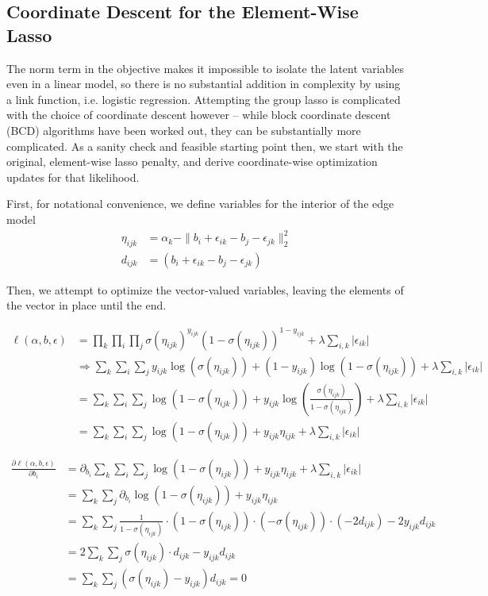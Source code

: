 \documentclass[11pt]{scrartcl}
\begin{document}
\subsection{Coordinate Descent for the Element-Wise Lasso}

The norm term in the objective makes it impossible to isolate the latent variables even in a linear model, so there is no substantial addition in complexity by using a link function, i.e. logistic regression. Attempting the group lasso is complicated with the choice of coordinate descent however -- while block coordinate descent (BCD) algorithms have been worked out, they can be substantially more complicated. As a sanity check and feasible starting point then, we start with the original, element-wise lasso penalty, and derive coordinate-wise optimization updates for that likelihood.

First, for notational convenience, we define variables for the interior of the edge model
\begin{align*}
\eta_{ijk} &= \alpha_k - \|b_i + \epsilon_{ik} - b_j - \epsilon_{jk}\|^2_2\\
d_{ijk} &= (b_i + \epsilon_{ik} - b_j - \epsilon_{jk})
\end{align*}

Then, we attempt to optimize the vector-valued variables, leaving the elements of the vector in place until the end.

\begin{align}
\ell(\alpha, b, \epsilon) &= \prod_k \prod_i \prod_{j} \sigma(\eta_{ijk})^{y_{ijk}}(1-\sigma(\eta_{ijk}))^{1-y_{ijk}} + \lambda \sum_{i,k} |\epsilon_{ik}|\\
&\Rightarrow \sum_k \sum_i \sum_{j} y_{ijk}\log(\sigma(\eta_{ijk})) + (1-y_{ijk})\log(1-\sigma(\eta_{ijk})) + \lambda \sum_{i,k} |\epsilon_{ik}|\\
&= \sum_k \sum_i \sum_{j} \log(1-\sigma(\eta_{ijk})) + y_{ijk}\log(\frac{\sigma(\eta_{ijk})}{1- \sigma(\eta_{ijk})})+ \lambda \sum_{i,k} |\epsilon_{ik}|\\
&= \sum_k \sum_i \sum_{j} \log(1-\sigma(\eta_{ijk})) + y_{ijk}\eta_{ijk} + \lambda \sum_{i,k} |\epsilon_{ik}|
\end{align}


\begin{align}
\frac{\partial \ell(\alpha, b, \epsilon)}{\partial b_i} &= \partial_{b_i} \sum_k \sum_i \sum_{j} \log(1-\sigma(\eta_{ijk})) + y_{ijk}\eta_{ijk} + \lambda \sum_{i,k} |\epsilon_{ik}|\\
&= \sum_k \sum_{j} \partial_{b_i} \log(1-\sigma(\eta_{ijk})) + y_{ijk}\eta_{ijk}\\
&= \sum_k \sum_{j} \frac{1}{1-\sigma(\eta_{ijk})} \cdot (1-\sigma(\eta_{ijk})) \cdot(-\sigma(\eta_{ijk})) \cdot (-2d_{ijk}) - 2y_{ijk}d_{ijk}\\
&= 2\sum_k \sum_{j} \sigma(\eta_{ijk}) \cdot d_{ijk} - y_{ijk}d_{ijk}\\
&= \sum_k \sum_{j} (\sigma(\eta_{ijk}) - y_{ijk})d_{ijk} = 0
\end{align}
\end{document}

